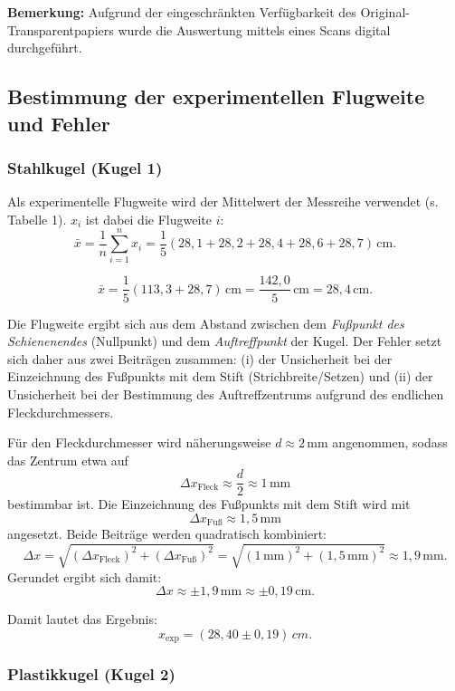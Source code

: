 \documentclass{article}
\begin{document}
\noindent\textbf{Bemerkung:} Aufgrund der eingeschränkten Verfügbarkeit des Original-Transparentpapiers wurde die Auswertung mittels eines Scans digital durchgeführt.



\subsection{Bestimmung der experimentellen Flugweite und Fehler}
\subsubsection{Stahlkugel (Kugel 1)}

Als experimentelle Flugweite wird der Mittelwert der Messreihe verwendet (s. Tabelle 1). $x_i$ ist dabei die Flugweite $i$:
\[
\bar{x}=\frac{1}{n}\sum_{i=1}^{n}x_i
      =\frac{1}{5}\left(28{,}1+28{,}2+28{,}4+28{,}6+28{,}7\right)\,\mathrm{cm}.
\]

\[
\bar{x}=\frac{1}{5}\left(113{,}3+28{,}7\right)\,\mathrm{cm}
      =\frac{142{,}0}{5}\,\mathrm{cm}
      =28{,}4\,\mathrm{cm}.
\]


\noindent 
Die Flugweite ergibt sich aus dem Abstand zwischen dem \emph{Fußpunkt des Schienenendes} (Nullpunkt) und dem \emph{Auftreffpunkt} der Kugel. 
Der Fehler setzt sich daher aus zwei Beiträgen zusammen: 
(i) der Unsicherheit bei der Einzeichnung des Fußpunkts mit dem Stift (Strichbreite/Setzen) und 
(ii) der Unsicherheit bei der Bestimmung des Auftreffzentrums aufgrund des endlichen Fleckdurchmessers.

\noindent Für den Fleckdurchmesser wird näherungsweise \(d \approx 2\,\mathrm{mm}\) angenommen, sodass das Zentrum etwa auf
\[
\Delta x_{\text{Fleck}} \approx \frac{d}{2} \approx 1\,\mathrm{mm}
\]
bestimmbar ist. 
Die Einzeichnung des Fußpunkts mit dem Stift wird mit
\[
\Delta x_{\text{Fuß}} \approx 1{,}5\,\mathrm{mm}
\]
angesetzt. 
Beide Beiträge werden quadratisch kombiniert:
\[
\Delta x
=
\sqrt{(\Delta x_{\text{Fleck}})^2+(\Delta x_{\text{Fuß}})^2}
=
\sqrt{(1\,\mathrm{mm})^2+(1{,}5\,\mathrm{mm})^2}
\approx 1{,}9\,\mathrm{mm}.
\]
Gerundet ergibt sich damit:
\[
\Delta x \approx \pm 1{,}9\,\mathrm{mm} \approx \pm 0{,}19\,\mathrm{cm}.
\]

\noindent Damit lautet das Ergebnis:
\[
    x_{\mathrm{exp}} = (28{,}40 \pm 0{,}19)\,\si{cm}.
\]


\subsubsection{Plastikkugel (Kugel 2)}
\end{document}
